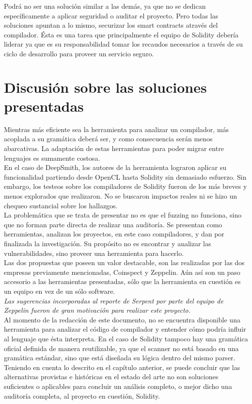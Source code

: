 Podrá no ser una solución similar a las demás, ya que no se dedican específicamente a aplicar seguridad o auditar el proyecto. Pero todas las soluciones apuntan a lo mismo, securizar los smart contracts através del compilador. Ésta es una tarea que principalmente el equipo de Solidity debería liderar ya que es su responsabilidad tomar los recaudos necesarios a través de su ciclo de desarrollo para proveer un servicio seguro.

\section{Discusión sobre las soluciones presentadas}
Mientras más eficiente sea la herramienta para analizar un compilador, más acoplada a su gramática deberá ser, y como consecuencia serán menos abarcativas. La adaptación de estas herramientas para poder migrar entre lenguajes es sumamente costosa.\\

En el caso de DeepSmith, los autores de la herramienta lograron aplicar su funcionalidad partiendo desde OpenCL hasta Solidity sin demasiado esfuerzo. Sin embargo, los testeos sobre los compiladores de Solidity fueron de los más breves y menos explorados que realizaron. No se buscaron impactos reales ni se hizo un chequeo sustancial sobre los hallazgos.\\

La problemática que se trata de presentar no es que el fuzzing no funciona, sino que no forman parte directa de realizar una auditoría. Se presentan como herramientas, analizan los proyectos, en este caso compiladores, y dan por finalizada la investigación. Su propósito no es encontrar y analizar las vulnerabilidades, sino proveer una herramienta para hacerlo.\\

Las dos propuestas que poseen un valor destacable, son las realizadas por las dos empresas previamente mencionadas, Coinspect y Zeppelin. Aún así son un paso accesorio a las herramientas presentadas, sólo que la herramienta en cuestión es un equipo en vez de un sólo software.\\

\textit{Las sugerencias incorporadas al reporte de Serpent por parte del equipo de Zeppelin fueron de gran motivación para realizar este proyecto.}\\

Al momento de la redacción de este documento, no se encuentra disponible una herramienta para analizar el código de compilador y entender cómo podría influir al lenguaje que ésta interpreta. En el caso de Solidity tampoco hay una gramática oficial definida de manera reutilizable, ya que el scanner no está basado en una gramática estándar, sino que está diseñada su lógica dentro del mismo parser.
Teniendo en cuenta lo descrito en el capítulo anterior, se puede concluir que las alternativas provistas e históricas en el estado del arte no son soluciones suficientes o aplicables para concluir un análisis completo, o mejor dicho una auditoría completa, al proyecto en cuestión, Solidity.
